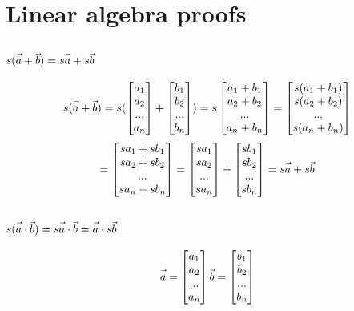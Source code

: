 \documentclass{article}
\newcommand{\fvec}[1]{\vec{\vphantom{A}#1}}
\begin{document}
\section{Linear algebra proofs}
\subsection{$ s(\fvec{a} + \fvec{b}) = s\fvec{a} + s\fvec{b} $}
$$ s(\fvec{a} + \fvec{b}) =
   s(\begin{bmatrix}a_1 \\ a_2 \\ ... \\ a_n\end{bmatrix} + \begin{bmatrix}b_1 \\ b_2 \\ ... \\ b_n\end{bmatrix}) =
   s\begin{bmatrix}a_1 + b_1 \\ a_2 + b_2 \\ ... \\ a_n + b_n\end{bmatrix} =
   \begin{bmatrix}s(a_1 + b_1) \\ s(a_2 + b_2) \\ ... \\ s(a_n + b_n)\end{bmatrix} $$
$$ = \begin{bmatrix}s a_1 + s b_1 \\ s a_2 + s b_2 \\ ... \\ s a_n + s b_n\end{bmatrix} =
   \begin{bmatrix}s a_1 \\ s a_2 \\ ... \\ s a_n\end{bmatrix} + \begin{bmatrix}s b_1 \\ s b_2 \\ ... \\ s b_n\end{bmatrix} =
   s\fvec{a} + s\fvec{b} $$

\subsection{$ s(\fvec{a} \cdot \fvec{b}) = s\fvec{a} \cdot \fvec{b} = \fvec{a} \cdot s\fvec{b} $}
$$ \fvec{a} = \begin{bmatrix}a_1 \\ a_2 \\ ... \\ a_n\end{bmatrix}
    \fvec{b} = \begin{bmatrix}b_1 \\ b_2 \\ ... \\ b_n\end{bmatrix} $$
\end{document}
